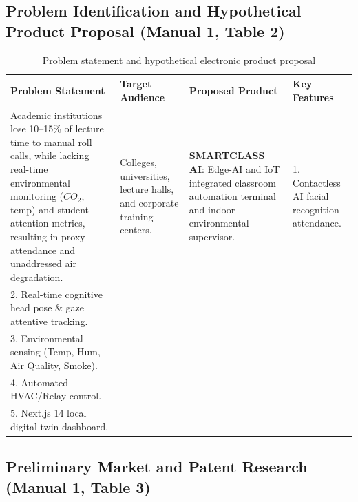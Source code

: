 \documentclass[11pt,a4paper]{article}
\begin{document}
\subsection{Problem Identification and Hypothetical Product Proposal (Manual 1, Table 2)}

\begin{table}[h!]
\centering
\caption{Problem statement and hypothetical electronic product proposal}
\begin{tabular}{|p{4.2cm}|p{2.8cm}|p{3.5cm}|p{4.5cm}|}
\hline
\textbf{Problem Statement} & \textbf{Target Audience} & \textbf{Proposed Product} & \textbf{Key Features} \\ \hline
Academic institutions lose 10–15\% of lecture time to manual roll calls, while lacking real-time environmental monitoring ($CO_2$, temp) and student attention metrics, resulting in proxy attendance and unaddressed air degradation. & Colleges, universities, lecture halls, and corporate training centers. & \textbf{SMARTCLASS AI}: Edge-AI and IoT integrated classroom automation terminal and indoor environmental supervisor. & 1. Contactless AI facial recognition attendance.\\ 2. Real-time cognitive head pose \& gaze attentive tracking.\\ 3. Environmental sensing (Temp, Hum, Air Quality, Smoke).\\ 4. Automated HVAC/Relay control.\\ 5. Next.js 14 local digital-twin dashboard. \\ \hline
\end{tabular}
\end{table}

\subsection{Preliminary Market and Patent Research (Manual 1, Table 3)}
\end{document}
